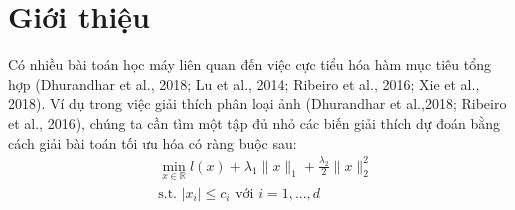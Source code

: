 \chapter{Giới thiệu}
Có nhiều bài toán học máy liên quan đến việc cực tiểu hóa hàm mục tiêu tổng 
hợp (Dhurandhar et al., 2018; Lu et al., 2014; Ribeiro et al., 2016; Xie et al., 2018).
Ví dụ trong việc giải thích phân loại ảnh (Dhurandhar et al.,2018; Ribeiro et al., 2016), 
chúng ta cần tìm một tập đủ nhỏ các biến giải thích dự đoán bằng cách giải
bài toán tối ưu hóa có ràng buộc sau:
\begin{equation}
    \begin{split}
        & \min_{x \in \mathbb{R}} l(x) + \lambda_1 \lVert x \rVert_1
        + \frac{\lambda_2}{2} \lVert x \rVert_2^2 \\
        & \textrm{s.t.  } |x_i| \leq c_i \textrm{   với } i = 1,...,d \\
    \end{split}
\end{equation}
